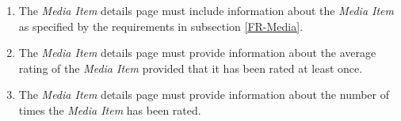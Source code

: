 \begin{enumerate}[label=\textbf{FR-\twodigits*}, resume]
	\item The \textit{Media Item} details page must include information about the \textit{Media Item} as specified by the requirements in subsection \ref{FR-Media}.
	\item The \textit{Media Item} details page must provide information about the average rating of the \textit{Media Item} provided that it has been rated at least once.
	\item The \textit{Media Item} details page must provide information about the number of times the \textit{Media Item} has been rated.
\end{enumerate}
			
%
